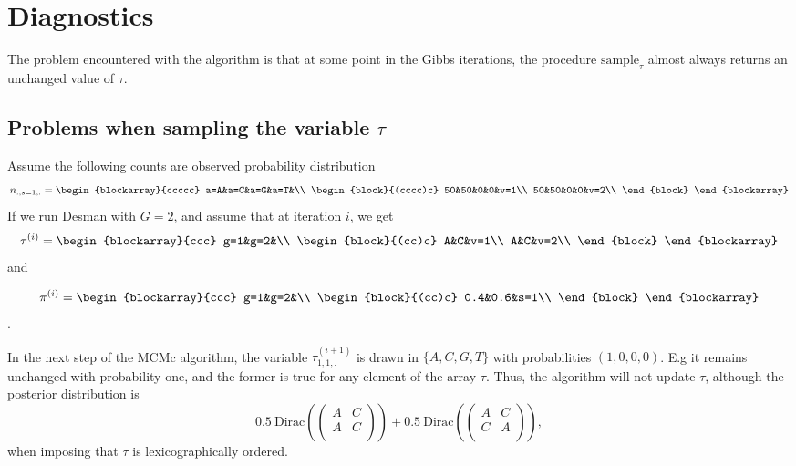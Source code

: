 \documentclass{article}
\begin{document}
\section{Diagnostics}
The problem encountered with the algorithm is that at some point in the Gibbs iterations, the procedure $\mathrm{sample}_{\tau}$ almost always returns an unchanged value of $\tau$.


\subsection{Problems when sampling the variable $\tau$}
Assume the following counts are observed probability distribution
$$n_{.,s=1,.}=\begin{blockarray}{ccccc}
    a=A&a=C&a=G&a=T&\\
    \begin{block}{(cccc)c}
    50&50&0&0&v=1\\
    50&50&0&0&v=2\\
    \end{block}
\end{blockarray}$$
If we run Desman with $G=2$, and assume that at iteration $i$, we get 
$$\tau^{(i)}=\begin{blockarray}{ccc}
    g=1&g=2&\\
    \begin{block}{(cc)c}
    A&C&v=1\\
    A&C&v=2\\
    \end{block}
\end{blockarray}$$ and 

$$\pi^{(i)}=\begin{blockarray}{ccc}
    g=1&g=2&\\
    \begin{block}{(cc)c}
    0.4&0.6&s=1\\
    \end{block}
\end{blockarray}$$.

In the next step of the MCMc algorithm, the variable $\tau^{(i+1)}_{1,1,.}$ is drawn in $\{A,C,G,T\}$ with probabilities
$(1,0,0,0)$. E.g it remains unchanged with probability one, and the former is true for any element of the array $\tau$. Thus, the algorithm will not update $\tau$, although the posterior distribution is $$0.5~\mathrm{Dirac}\left(\begin{pmatrix}
    A&C\\
    A&C\\
    \end{pmatrix}\right)+0.5~\mathrm{Dirac}\left(\begin{pmatrix}
    A&C\\
    C&A\\
    \end{pmatrix}\right),$$  when imposing that  $\tau$ is lexicographically ordered.
\end{document}
